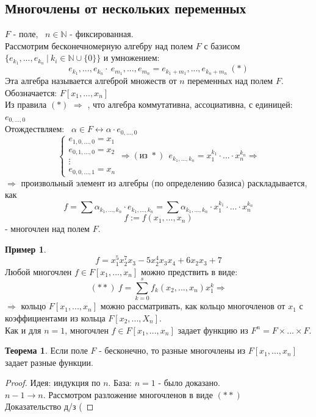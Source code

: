 \documentclass[a4paper, 12pt]{article}
\newcommand{\N}{\mathbb N}
\theoremstyle{definition}
\newtheorem*{theorem}{Теорема}
\newtheorem*{example1}{Пример}
\begin{document}
  \subsection{Многочлены от нескольких переменных}
  $F$ - поле, \ $n \in \N$ - фиксированная. \\
  Рассмотрим бесконечномерную алгебру над полем $F$ с базисом \\ $\{e_{k_1},...,e_{k_n} \ | \ k_i \in \N \cup \{0\} \} $ и умножением:
  $$e_{k_1},...,e_{k_n} \cdot \ e_{m_1},...,e_{m_n} = e_{k_1 + m_1},...,e_{k_n + m_n} \ (*)$$
  Эта алгебра называется алгеброй множеств от $n$ переменных над полем $F$. \\
  Обозначается: $F[x_1,...,x_n]$\\
  Из правила $(*)$ $\Longrightarrow $ , что алгебра коммутативна, ассоциативна, с единицей: $e_{0,...,0}$\\
  Отождествляем: \ $\alpha \in F \longleftrightarrow \alpha \cdot e_{0,...,0}$
  $$\begin{cases}
    e_{1,0,...,0} = x_1\\
    e_{0,1,...,0} = x_2\\
    \vdots\\
    e_{0,0,...,1} = x_n
  \end{cases} \Longrightarrow (\text{из } *) \ \ e_{k_1,...,k_n} = x_1^{k_1} \cdot ... \cdot x_n^{k_n} \Longrightarrow $$ 
  $\Longrightarrow $ произвольный элемент из алгебры (по определению базиса) раскладывается, как $$f = \sum \alpha_{k_1,...,k_n} \cdot e_{k_1,...,k_n} = \sum \alpha_{k_1,...,k_n} \cdot x_1^{k_1} \cdot ... \cdot x_n^{k_n}$$
  $$ f:= f(x_1,...,x_n)$$ 
  - многочлен над полем $F$.
  \begin{example1}
    $$f = x_1^5 x_2^7 x_3 - 5x_2^4x_3x_4 + 6x_2x_3 + 7$$
    Любой многочлен $f \in F[x_1,...,x_n]$ можно предствить в виде:
    $$(**) \ f = \sum \limits_{k=0}^sf_k(x_2,...,x_n)x_1^k \Longrightarrow $$
    $\Longrightarrow$ кольцо $F[x_1,...,x_n]$ можно рассматривать, как кольцо многочленов от $x_1$ с коэффициентами из кольца $F[x_2,...,X_n]$.\\
    Как и для $n=1$, многочлен $f \in F[x_1,...,x_n]$ задает функцию из $F^n = F \times ... \times F$.      
  \end{example1} 
  \begin{theorem}
    Если поле $F$ - бесконечно, то разные многочлены из $F[x_1,...,x_n]$ задает разные функции.
  \end{theorem}
  \begin{proof}
    Идея: индукция по $n$. База: $n=1$ - было доказано.\\
    $n-1 \to n$. Рассмотром разложение многочленов в виде $(**)$\\
    Доказательство д/з (   
  \end{proof}
\end{document}
